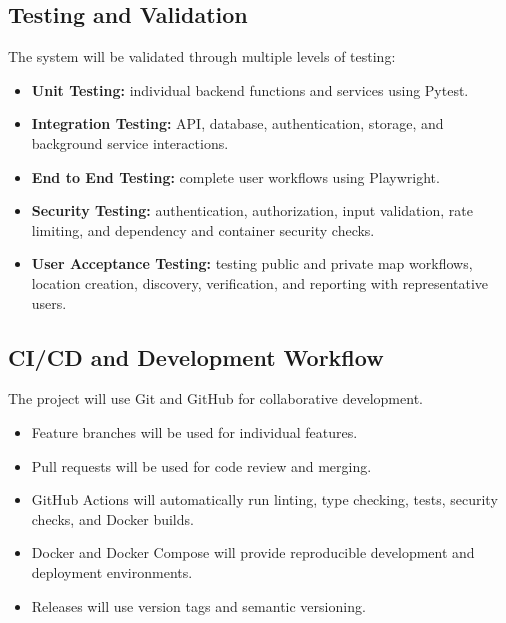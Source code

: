 \documentclass[11pt,a4paper]{article}
\begin{document}
\subsection{Testing and Validation}

The system will be validated through multiple levels of testing:

\begin{itemize}[leftmargin=0.7cm]
    \item \textbf{Unit Testing:} individual backend functions and services
    using Pytest.
    
    \item \textbf{Integration Testing:} API, database, authentication,
    storage, and background service interactions.
    
    \item \textbf{End to End Testing:} complete user workflows using
    Playwright.
    
    \item \textbf{Security Testing:} authentication, authorization, input
    validation, rate limiting, and dependency and container security checks.
    
    \item \textbf{User Acceptance Testing:} testing public and private map
    workflows, location creation, discovery, verification, and reporting
    with representative users.
\end{itemize}

\subsection{CI/CD and Development Workflow}

The project will use Git and GitHub for collaborative development.

\begin{itemize}[leftmargin=0.7cm]
    \item Feature branches will be used for individual features.
    \item Pull requests will be used for code review and merging.
    \item GitHub Actions will automatically run linting, type checking,
    tests, security checks, and Docker builds.
    \item Docker and Docker Compose will provide reproducible development and
    deployment environments.
    \item Releases will use version tags and semantic versioning.
\end{itemize}
\end{document}
